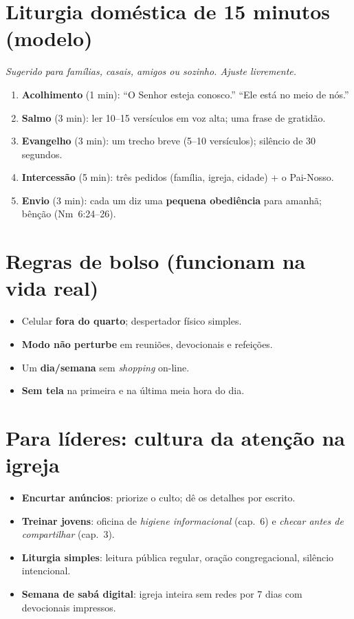 \section{Liturgia doméstica de 15 minutos (modelo)}
\noindent\textit{Sugerido para famílias, casais, amigos ou sozinho. Ajuste livremente.}
\begin{enumerate}[leftmargin=*,nosep]
  \item \textbf{Acolhimento} (1 min): ``O Senhor esteja conosco.'' ``Ele está no meio de nós.''
  \item \textbf{Salmo} (3 min): ler 10--15 versículos em voz alta; uma frase de gratidão.
  \item \textbf{Evangelho} (3 min): um trecho breve (5--10 versículos); silêncio de 30 segundos.
  \item \textbf{Intercessão} (5 min): três pedidos (família, igreja, cidade) + o Pai-Nosso.
  \item \textbf{Envio} (3 min): cada um diz uma \textbf{pequena obediência} para amanhã; bênção (Nm~6:24--26).
\end{enumerate}

\section{Regras de bolso (funcionam na vida real)}
\begin{checklist}
\begin{itemize}[leftmargin=*,noitemsep]
  \item Celular \textbf{fora do quarto}; despertador físico simples.
  \item \textbf{Modo não perturbe} em reuniões, devocionais e refeições.
  \item Um \textbf{dia/semana} sem \emph{shopping} on-line.
  \item \textbf{Sem tela} na primeira e na última meia hora do dia.
\end{itemize}
\end{checklist}

\section{Para líderes: cultura da atenção na igreja}
\begin{checklist}[title={Ações práticas}]
\begin{itemize}[leftmargin=*,noitemsep]
  \item \textbf{Encurtar anúncios}: priorize o culto; dê os detalhes por escrito.
  \item \textbf{Treinar jovens}: oficina de \emph{higiene informacional} (cap.~6) e \emph{checar antes de compartilhar} (cap.~3).
  \item \textbf{Liturgia simples}: leitura pública regular, oração congregacional, silêncio intencional.
  \item \textbf{Semana de sabá digital}: igreja inteira sem redes por 7 dias com devocionais impressos.
\end{itemize}
\end{checklist}

